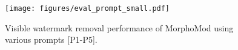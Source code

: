 \begin{figure}[t]
    \centering
    \texttt{[image: figures/eval\_prompt\_small.pdf]}
    \caption{Visible watermark removal performance of MorphoMod using various prompts [P1-P5].}
    \label{fig:eval_prompts_small}
\end{figure}